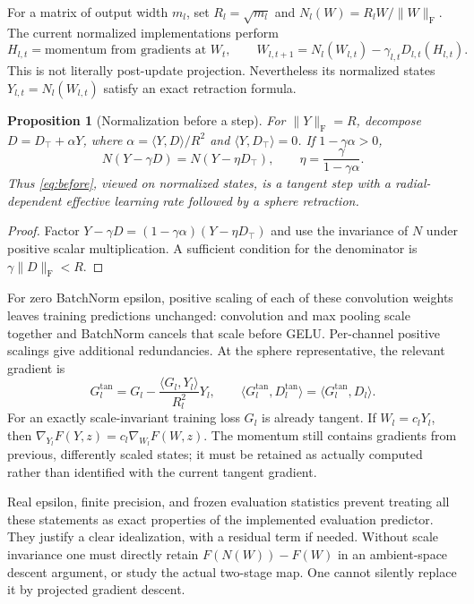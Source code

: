 \documentclass[11pt]{article}
\newtheorem{proposition}[theorem]{Proposition}
\newcommand{\ip}[2]{\langle #1,#2\rangle}
\newcommand{\F}[1]{\lVert #1\rVert_{\mathrm F}}
\begin{document}
For a matrix of output width $m_l$, set $R_l=\sqrt{m_l}$ and
$N_l(W)=R_lW/\F{W}$. The current normalized implementations perform
\begin{equation}\label{eq:before}
 H_{l,t}=\text{momentum from gradients at }W_t,\qquad
 W_{l,t+1}=N_l(W_{l,t})-\gamma_{l,t}D_{l,t}(H_{l,t}).
\end{equation}
This is not literally post-update projection. Nevertheless its normalized
states $Y_{l,t}=N_l(W_{l,t})$ satisfy an exact retraction formula.

\begin{proposition}[Normalization before a step]
For $\F{Y}=R$, decompose $D=D_\top+\alpha Y$, where
$\alpha=\ip{Y}{D}/R^2$ and $\ip{Y}{D_\top}=0$. If $1-\gamma\alpha>0$,
\begin{equation}\label{eq:retraction}
 N(Y-\gamma D)=N(Y-\eta D_\top),\qquad
 \eta=\frac{\gamma}{1-\gamma\alpha}.
\end{equation}
Thus \eqref{eq:before}, viewed on normalized states, is a tangent step with
a radial-dependent effective learning rate followed by a sphere retraction.
\end{proposition}
\begin{proof}
Factor $Y-\gamma D=(1-\gamma\alpha)(Y-\eta D_\top)$ and use the
invariance of $N$ under positive scalar multiplication. A sufficient
condition for the denominator is $\gamma\F{D}<R$.
\end{proof}

For zero BatchNorm epsilon, positive scaling of each of these convolution
weights leaves training predictions unchanged: convolution and max pooling
scale together and BatchNorm cancels that scale before GELU. Per-channel
positive scalings give additional redundancies. At the sphere representative,
the relevant gradient is
\begin{equation}\label{eq:tangent}
 G_l^{\mathrm{tan}}=G_l-\frac{\ip{G_l}{Y_l}}{R_l^2}Y_l,\qquad
 \ip{G_l^{\mathrm{tan}}}{D_l^{\mathrm{tan}}}
   =\ip{G_l^{\mathrm{tan}}}{D_l}.
\end{equation}
For an exactly scale-invariant training loss $G_l$ is already tangent.
If $W_l=c_lY_l$, then $\nabla_{Y_l}F(Y,z)=c_l\nabla_{W_l}F(W,z)$.
The momentum still contains gradients from previous, differently scaled
states; it must be retained as actually computed rather than identified
with the current tangent gradient.

Real epsilon, finite precision, and frozen evaluation statistics prevent
treating all these statements as exact properties of the implemented
evaluation predictor. They justify a clear idealization, with a residual
term if needed. Without scale invariance one must directly retain
$F(N(W))-F(W)$ in an ambient-space descent argument, or study the actual
two-stage map. One cannot silently replace it by projected gradient descent.
\end{document}
